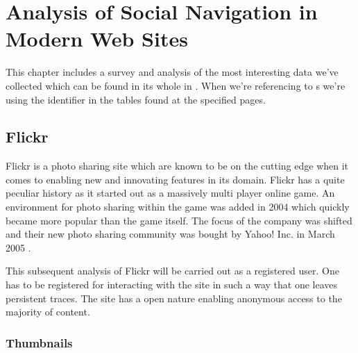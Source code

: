 \chapter{Analysis of Social Navigation in Modern Web Sites}
\label{chapter:analysis}

This chapter includes a survey and analysis of the most interesting
data we've collected which can be found in its whole in
. When we're referencing to s we're
using the identifier in the tables found at the specified pages.

\section{Flickr}
\label{section:analysis.flickr}


Flickr is a photo sharing site which are known to be on the cutting edge when
it comes to enabling new and innovating features in its domain. Flickr has a
quite peculiar history as it started out as a massively multi player online
game. An environment for photo sharing within the game was added in 2004 which
quickly became more popular than the game itself. The focus of the company was
shifted and their new photo sharing community was bought by Yahoo! Inc. in
March 2005 \citep[]{livingston07}.

This subsequent
analysis of Flickr will be carried out as a registered user. One has to be
registered for interacting with the site in such a way that one leaves
persistent traces. The site has a open nature enabling anonymous access
to the majority of content.

\subsection{Thumbnails}

